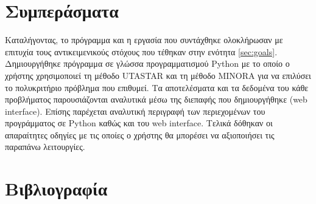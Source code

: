 \documentclass[11pt,a4paper,titlepage]{article}
\numberwithin{equation}{section}
\begin{document}
\section{Συμπεράσματα}
\label{sec:conclusion}
Καταλήγοντας, το πρόγραμμα και η εργασία που συντάχθηκε ολοκλήρωσαν με επιτυχία τους αντικειμενικούς στόχους που τέθηκαν στην ενότητα \ref{sec:goals}. Δημιουργήθηκε πρόγραμμα σε γλώσσα προγραμματισμού Python με το οποίο ο χρήστης χρησιμοποιεί τη μέθοδο UTASTAR και τη μέθοδο MINORA για να επιλύσει το πολυκριτήριο πρόβλημα που επιθυμεί. Τα αποτελέσματα και τα δεδομένα του κάθε προβλήματος παρουσιάζονται αναλυτικά μέσω της διεπαφής που δημιουργήθηκε (web interface). Επίσης παρέχεται αναλυτική περιγραφή των περιεχομένων του προγράμματος σε Python καθώς και του web interface. Τελικά δόθηκαν οι απαραίτητες οδηγίες με τις οποίες ο χρήστης θα μπορέσει να αξιοποιήσει τις παραπάνω λειτουργίες.

\section{Βιβλιογραφία}
\label{sec:bibliography}
\nocite{utastar-lecture}
\nocite{utastar-book}
\nocite{sya-book}

\printbibliography
\end{document}

